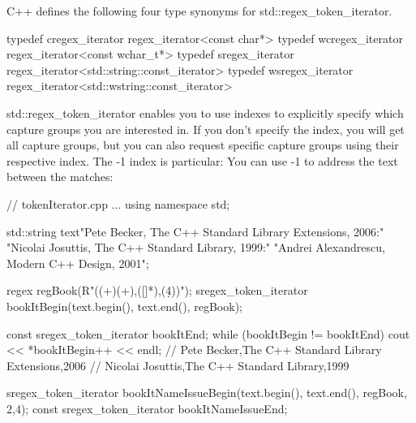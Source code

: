 
C++ defines the following four type synonyms for std::regex\_token\_iterator.

\begin{cpp}
typedef cregex_iterator regex_iterator<const char*>
typedef wcregex_iterator regex_iterator<const wchar_t*>
typedef sregex_iterator regex_iterator<std::string::const_iterator>
typedef wsregex_iterator regex_iterator<std::wstring::const_iterator>
\end{cpp}

std::regex\_token\_iterator enables you to use indexes to explicitly specify which capture groups you are interested in. If you don’t specify the index, you will get all capture groups, but you can also request specific capture groups using their respective index. The -1 index is particular: You can use -1 to address the text between the matches:


\begin{cpp}
// tokenIterator.cpp
...
using namespace std;

std::string text{"Pete Becker, The C++ Standard Library Extensions, 2006:"
				 "Nicolai Josuttis, The C++ Standard Library, 1999:"
				 "Andrei Alexandrescu, Modern C++ Design, 2001"};
	
regex regBook(R"((\w+)\s(\w+),([\w\s\+]*),(\d{4}))");
sregex_token_iterator bookItBegin(text.begin(), text.end(), regBook);

const sregex_token_iterator bookItEnd;
while (bookItBegin != bookItEnd){
	cout << *bookItBegin++ << endl;
} // Pete Becker,The C++ Standard Library Extensions,2006
  // Nicolai Josuttis,The C++ Standard Library,1999

sregex_token_iterator bookItNameIssueBegin(text.begin(), text.end(),
										   regBook, {{2,4}});
const sregex_token_iterator bookItNameIssueEnd;
\end{cpp}










